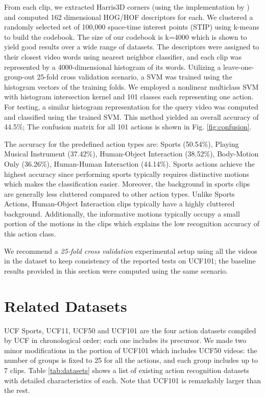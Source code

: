 \documentclass[10pt,twocolumn,letterpaper]{article}
\begin{document}
From each clip, we extracted Harris3D corners (using the implementation by \cite{HOHA}) and computed 162 dimensional HOG/HOF descriptors for each. We clustered a randomly selected set of 100,000 space-time interest points (STIP) using k-means to build the codebook. The size of our codebook is k=4000 which is shown to yield good results over a wide range of datasets. The descriptors were assigned to their closest video words using nearest neighbor classifier, and each clip was represented by a 4000-dimensional histogram of its words. Utilizing a leave-one-group-out 25-fold cross validation scenario, a SVM was trained using the histogram vectors of the training folds. We employed a nonlinear multiclass SVM with histogram intersection kernel and 101 classes each representing one action. For testing, a similar histogram representation for the query video was computed and classified using the trained SVM. This method yielded an overall accuracy of 44.5\%; The confusion matrix for all 101 actions is shown in Fig. \ref{fig:confusion}.

The accuracy for the predefined action types are:  Sports (50.54\%), Playing Musical Instrument  (37.42\%), Human-Object Interaction (38.52\%), Body-Motion Only (36.26\%), Human-Human Interaction (44.14\%). Sports actions achieve the highest accuracy since performing sports typically requires distinctive motions which makes the classification easier. Moreover, the background in sports clips are generally less cluttered compared to other action types. Unlike Sports Actions, Human-Object Interaction clips typically have a highly cluttered background. Additionally, the informative motions typically occupy a small portion of the motions in the clips which explains the low recognition accuracy of this action class.

We recommend a \emph{25-fold cross validation} experimental setup using all the videos in the dataset to keep consistency of the reported tests on UCF101; the baseline results provided in this section were computed using the same scenario.


\section{Related Datasets}

UCF Sports, UCF11, UCF50 and UCF101 are the four action  datasets compiled by UCF in chronological order; each one includes its precursor. We made two minor modifications in the portion of UCF101 which includes UCF50 videos: the number of groups is fixed to 25 for all the actions, and each group includes up to 7 clips. Table \ref{tab:datasets}  shows a list of existing action recognition datasets with detailed characteristics of each. Note that UCF101 is remarkably larger than the rest.
\end{document}
